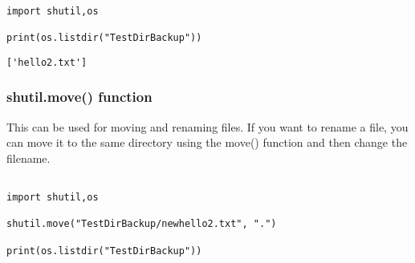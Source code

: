 \documentclass[11pt]{article}
\begin{document}
\begin{verbatim}

import shutil,os

print(os.listdir("TestDirBackup"))

\end{verbatim}

\begin{verbatim}
['hello2.txt']
\end{verbatim}

\subsubsection{shutil.move() function}
\label{sec:org227b8c6}

This can be used for moving and renaming files. If you want to rename a file, you can move it to the same directory using the move() function and then change the filename.

\begin{verbatim}

import shutil,os

shutil.move("TestDirBackup/newhello2.txt", ".")

print(os.listdir("TestDirBackup"))

\end{verbatim}
\end{document}

